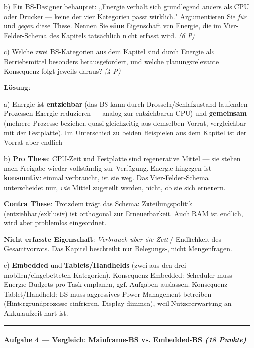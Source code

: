 \documentclass[11pt, a4paper]{article}
\begin{document}
b) Ein BS-Designer behauptet: „Energie verhält sich grundlegend anders als CPU oder Drucker — keine der vier Kategorien passt wirklich." Argumentieren Sie \textit{für} und \textit{gegen} diese These. Nennen Sie \textbf{eine} Eigenschaft von Energie, die im Vier-Felder-Schema des Kapitels tatsächlich nicht erfasst wird. \textit{(6 P)}


c) Welche zwei BS-Kategorien aus dem Kapitel sind durch Energie als Betriebsmittel besonders herausgefordert, und welche planungsrelevante Konsequenz folgt jeweils daraus? \textit{(4 P)}


\textbf{Lösung:}


a) Energie ist \textbf{entziehbar} (das BS kann durch Drosseln/Schlafzustand laufenden Prozessen Energie reduzieren — analog zur entziehbaren CPU) und \textbf{gemeinsam} (mehrere Prozesse beziehen quasi-gleichzeitig aus demselben Vorrat, vergleichbar mit der Festplatte). Im Unterschied zu beiden Beispielen aus dem Kapitel ist der Vorrat aber endlich.


b) \textbf{Pro These}: CPU-Zeit und Festplatte sind regenerative Mittel — sie stehen nach Freigabe wieder vollständig zur Verfügung. Energie hingegen ist \textbf{konsumtiv}: einmal verbraucht, ist sie weg. Das Vier-Felder-Schema unterscheidet nur, \textit{wie} Mittel zugeteilt werden, nicht, ob sie sich erneuern.

\textbf{Contra These}: Trotzdem trägt das Schema: Zuteilungspolitik (entziehbar/exklusiv) ist orthogonal zur Erneuerbarkeit. Auch RAM ist endlich, wird aber problemlos eingeordnet.

\textbf{Nicht erfasste Eigenschaft}: \textit{Verbrauch über die Zeit} / Endlichkeit des Gesamtvorrats. Das Kapitel beschreibt nur Belegungs-, nicht Mengenfragen.


c) \textbf{Embedded} und \textbf{Tablets/Handhelds} (zwei aus den drei mobilen/eingebetteten Kategorien). Konsequenz Embedded: Scheduler muss Energie-Budgets pro Task einplanen, ggf. Aufgaben auslassen. Konsequenz Tablet/Handheld: BS muss aggressives Power-Management betreiben (Hintergrundprozesse einfrieren, Display dimmen), weil Nutzererwartung an Akkulaufzeit hart ist.



\noindent\textcolor{rulegray}{\rule{\linewidth}{0.4pt}}


\paragraph{Aufgabe 4 — Vergleich: Mainframe-BS vs. Embedded-BS \textit{(18 Punkte)}}\mbox{}\\[2pt]
\end{document}
